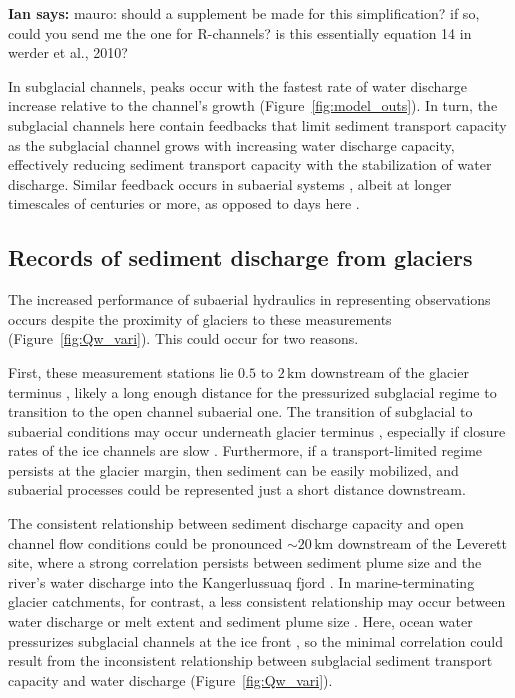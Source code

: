 \documentclass[11pt]{article}
\newcommand{\ian}[1]{{\textbf{\color{blue}Ian says:} \color{blue} #1} }
\newcommand{\unit}[1]{$\mathrm{#1}$}
\begin{document}
\ian{mauro: should a supplement be made for this simplification? if so, could you send me the one for R-channels? is this essentially equation 14 in werder et al., 2010?}

In subglacial channels, peaks occur with the fastest rate of  water discharge increase relative to the channel's growth (Figure~\ref{fig:model_outs}).
In turn, the subglacial channels here contain feedbacks that limit sediment transport capacity as the subglacial channel grows with increasing water discharge capacity, effectively reducing sediment transport capacity with the stabilization of water discharge.
Similar feedback occurs in subaerial systems \citep{phillips2016}, albeit at longer timescales of centuries or more, as opposed to days here \citep{gimbert2016}.

\subsection{Records of sediment discharge  from glaciers}

The increased performance of subaerial hydraulics in representing observations occurs despite the proximity of glaciers to these measurements (Figure~\ref{fig:Qw_vari}).
This could occur for two reasons.

First, these measurement stations lie $0.5$ to $2$\,\unit{km} downstream of the glacier terminus \citep{cowton2012,felix2022}, likely a long enough distance for the pressurized subglacial regime to transition to the open channel subaerial one.
The transition of subglacial to subaerial conditions may occur underneath glacier terminus \citep{perolo2018}, especially if closure rates of the ice channels are slow  \citep{rothlisberger1972}.
Furthermore,  if a transport-limited regime persists at the glacier margin, then sediment can be easily mobilized, and subaerial processes could be represented just a short distance downstream.

The consistent relationship between sediment discharge capacity and open channel flow conditions could be pronounced $\sim20$\,\unit{km} downstream of the Leverett site, where a strong correlation persists between sediment plume size and the river's water discharge into the Kangerlussuaq fjord \citep{mcgrath2010}.
In marine-terminating glacier catchments, for contrast, a less consistent relationship may occur between water discharge or melt extent and sediment plume size \citep{tedstone2012}.
Here, ocean water pressurizes subglacial channels at the ice front \citep[e.g.][]{how2017}, so the minimal correlation could result from the inconsistent relationship between subglacial sediment transport capacity and water discharge (Figure~\ref{fig:Qw_vari}). 
\end{document}
